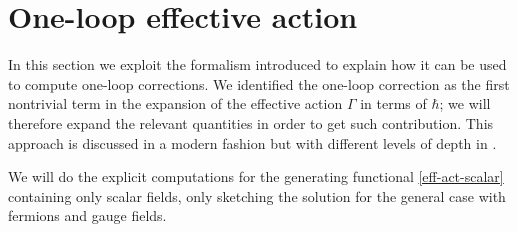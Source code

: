 \section{One-loop effective action}




In this section we exploit the formalism introduced to explain how it can be used to compute one-loop corrections. We identified the one-loop correction as the first nontrivial term in the expansion of the effective action $\Gamma$ in terms of $\hbar$; we will therefore expand the relevant quantities in order to get such contribution. This approach is discussed in a modern fashion but with different levels of depth in \cite{Avram, WeinbergII, Peskin}.

We will do the explicit computations for the generating functional \eqref{eff-act-scalar} containing only scalar fields, only sketching  the solution for the general case with fermions and gauge fields.

